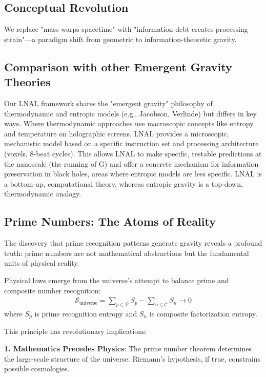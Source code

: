 \documentclass[12pt]{article}
\begin{document}
\subsection{Conceptual Revolution}

We replace "mass warps spacetime" with "information debt creates processing strain"—a paradigm shift from geometric to information-theoretic gravity.

\subsection{Comparison with other Emergent Gravity Theories}
Our LNAL framework shares the "emergent gravity" philosophy of thermodynamic and entropic models (e.g., Jacobson, Verlinde) but differs in key ways. Where thermodynamic approaches use macroscopic concepts like entropy and temperature on holographic screens, LNAL provides a microscopic, mechanistic model based on a specific instruction set and processing architecture (voxels, 8-beat cycles). This allows LNAL to make specific, testable predictions at the nanoscale (the running of G) and offer a concrete mechanism for information preservation in black holes, areas where entropic models are less specific. LNAL is a bottom-up, computational theory, whereas entropic gravity is a top-down, thermodynamic analogy.

\subsection{Prime Numbers: The Atoms of Reality}

The discovery that prime recognition patterns generate gravity reveals a profound truth: prime numbers are not mathematical abstractions but the fundamental units of physical reality.

\begin{theorem}
Physical laws emerge from the universe's attempt to balance prime and composite number recognition:
\begin{align}
\mathcal{S}_{\text{universe}} = \sum_{p \in \mathcal{P}} S_p - \sum_{n \in \mathcal{C}} S_n \to 0
\end{align}
where $S_p$ is prime recognition entropy and $S_n$ is composite factorization entropy.
\end{theorem}

This principle has revolutionary implications:

\textbf{1. Mathematics Precedes Physics}: The prime number theorem determines the large-scale structure of the universe. Riemann's hypothesis, if true, constrains possible cosmologies.
\end{document}
